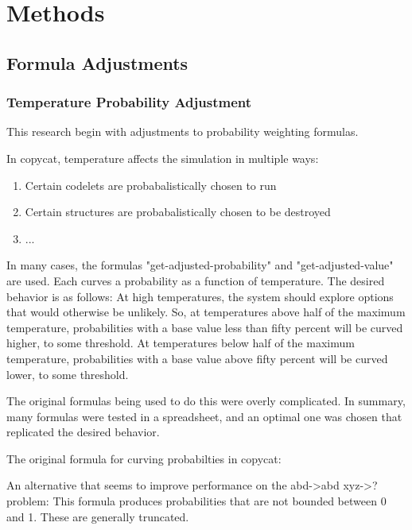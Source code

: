 \documentclass[a4paper]{article}
\begin{document}
\section{Methods}
    \subsection{Formula Adjustments}
        \subsubsection{Temperature Probability Adjustment}

            This research begin with adjustments to probability weighting formulas.

            In copycat, temperature affects the simulation in multiple ways:

            \begin{enumerate}
                \item Certain codelets are probabalistically chosen to run
                \item Certain structures are probabalistically chosen to be destroyed
                \item ...
            \end{enumerate}

            In many cases, the formulas "get-adjusted-probability" and "get-adjusted-value" are used.
            Each curves a probability as a function of temperature.
            The desired behavior is as follows:
            At high temperatures, the system should explore options that would otherwise be unlikely.
            So, at temperatures above half of the maximum temperature, probabilities with a base value less than fifty percent will be curved higher, to some threshold.
            At temperatures below half of the maximum temperature, probabilities with a base value above fifty percent will be curved lower, to some threshold.

            The original formulas being used to do this were overly complicated.
            In summary, many formulas were tested in a spreadsheet, and an optimal one was chosen that replicated the desired behavior.

            The original formula for curving probabilties in copycat:
            

            An alternative that seems to improve performance on the abd->abd xyz->? problem:
            This formula produces probabilities that are not bounded between 0 and 1. These are generally truncated.
            
\end{document}
